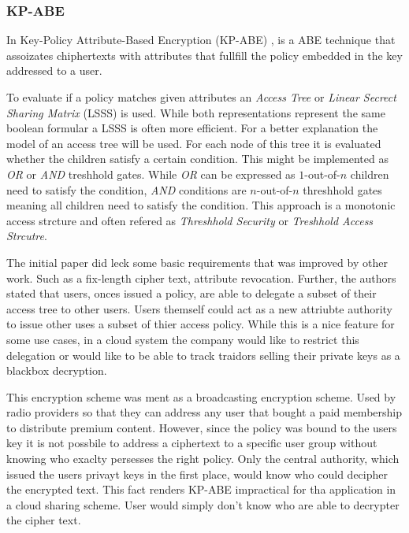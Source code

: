 \subsubsection{\ac{KP-ABE}}
In Key-Policy Attribute-Based Encryption (\ac{KP-ABE}) \cite{goyal2006attribute}, is a \ac{ABE} technique that assoizates chiphertexts with attributes that fullfill the policy embedded in the key addressed to a user. 

To evaluate if a policy matches given attributes an \textit{Access Tree} or \textit{Linear Secrect Sharing Matrix} (\ac{LSSS}) is used. While both representations represent the same boolean formular a \ac{LSSS} is often more efficient. For a better explanation the model of an access tree will be used. For each node of this tree it is evaluated whether the children satisfy a certain condition. This might be implemented as \textit{OR} or \textit{AND} treshhold gates. While \textit{OR} can be expressed as $1$-out-of-$n$ children need to satisfy the condition, \textit{AND} conditions are $n$-out-of-$n$ threshhold gates meaning all children need to satisfy the condition. This approach is a monotonic access strcture and often refered as \textit{Threshhold Security} or \textit{Treshhold Access Strcutre}. 

The initial paper did leck some basic requirements that was improved by other work. Such as a fix-length cipher text, attribute revocation. Further, the authors stated that users, onces issued a policy, are able to delegate a subset of their access tree to other users. Users themself could act as a new attriubte authority to issue other uses a subset of thier access policy. While this is a nice feature for some use cases, in a cloud system the company would like to restrict this delegation or would like to be able to track traidors selling their private keys as a blackbox decryption.

This encryption scheme was ment as a broadcasting encryption scheme. Used by radio providers so that they can address any user that bought a paid membership to distribute premium content. However, since the policy was bound to the users key it is not possbile to address a ciphertext to a specific user group without knowing who exaclty persesses the right policy. Only the central authority, which issued the users privayt keys in the first place, would know who could decipher the encrypted text. This fact renders \ac{KP-ABE} impractical for tha application in a cloud sharing scheme. User would simply don't know who are able to decrypter the cipher text. 

